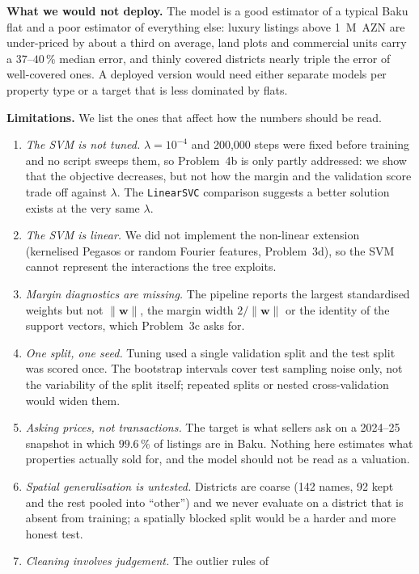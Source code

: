 \documentclass[10pt,twocolumn,a4paper]{article}
\begin{document}
\textbf{What we would not deploy.} The model is a good estimator of a typical
Baku flat and a poor estimator of everything else: luxury listings above
1~M~AZN are under-priced by about a third on average, land plots and
commercial units carry a $37$--$40\,\%$ median error, and thinly covered
districts nearly triple the error of well-covered ones. A deployed version would need either separate
models per property type or a target that is less dominated by flats.

\textbf{Limitations.} We list the ones that affect how the numbers should be
read.
\begin{enumerate}
  \item \emph{The SVM is not tuned.} $\lambda = 10^{-4}$ and 200{,}000 steps
    were fixed before training and no script sweeps them, so Problem~4b is
    only partly addressed: we show that the objective decreases, but not how
    the margin and the validation score trade off against $\lambda$. The
    \texttt{LinearSVC} comparison suggests a better solution exists at the
    very same $\lambda$.
  \item \emph{The SVM is linear.} We did not implement the non-linear
    extension (kernelised Pegasos or random Fourier features, Problem~3d), so
    the SVM cannot represent the interactions the tree exploits.
  \item \emph{Margin diagnostics are missing.} The pipeline reports the
    largest standardised weights but not $\lVert\mathbf{w}\rVert$, the margin
    width $2/\lVert\mathbf{w}\rVert$ or the identity of the support vectors,
    which Problem~3c asks for.
  \item \emph{One split, one seed.} Tuning used a single validation split and
    the test split was scored once. The bootstrap intervals cover test
    sampling noise only, not the variability of the split itself; repeated
    splits or nested cross-validation would widen them.
  \item \emph{Asking prices, not transactions.} The target is what sellers
    ask on a 2024--25 snapshot in which $99.6\,\%$ of listings are in Baku.
    Nothing here estimates what properties actually sold for, and the model
    should not be read as a valuation.
  \item \emph{Spatial generalisation is untested.} Districts are coarse (142
    names, 92 kept and the rest pooled into ``other'') and we never evaluate
    on a district that is absent from training; a spatially blocked split
    would be a harder and more honest test.
  \item \emph{Cleaning involves judgement.} The outlier rules of

\end{enumerate}
\end{document}
